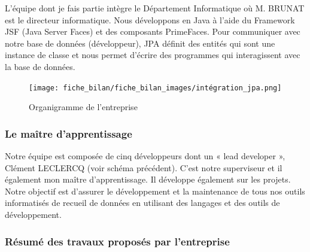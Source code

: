L’équipe dont je fais partie intègre le Département Informatique où M. BRUNAT est le directeur informatique.
Nous développons en Java à l’aide du Framework JSF (Java Server Faces) et
des composants PrimeFaces.
Pour communiquer avec notre base de données (développeur), JPA définit des
entités qui sont une instance de classe et nous permet d’écrire des
programmes qui interagissent avec la base de données.
\begin{figure}[ht]
    \centering
    \texttt{[image: fiche\_bilan/fiche\_bilan\_images/intégration\_jpa.png]} 
    \caption{Organigramme de l'entreprise}
\end{figure}

\subsubsection{Le maître d'apprentissage}
Notre équipe est composée de cinq développeurs dont un « lead developer »,
Clément LECLERCQ (voir schéma précédent). C’est notre superviseur et il
également mon maître d’apprentissage. Il développe également sur les projets.
Notre objectif est d’assurer le développement et la maintenance de tous nos outils informatisés de recueil de données en utilisant des langages et des outils
de développement.
\subsubsection{Résumé des travaux proposés par l'entreprise}

